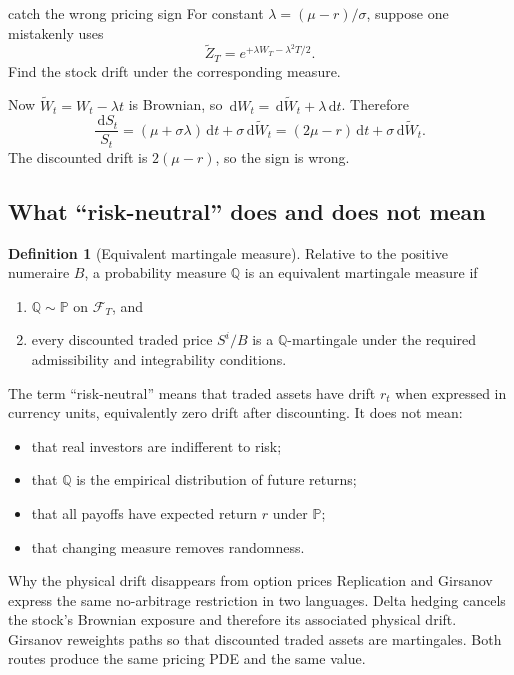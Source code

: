 \documentclass[10pt]{article}
\newcommand{\Pp}{\mathbb P}
\newcommand{\Q}{\mathbb Q}
\newcommand{\1}{\mathbf 1}
\newcommand{\cF}{\mathcal F}
\newcommand{\dd}{\,\mathrm d}
\theoremstyle{definition}
\newtheorem{definition}{Definition}[section]
\begin{document}
\begin{studentexercise}{catch the wrong pricing sign}
For constant \(\lambda=(\mu-r)/\sigma\), suppose one mistakenly uses
\[
\widetilde Z_T=e^{+\lambda W_T-\lambda^2T/2}.
\]
Find the stock drift under the corresponding measure.
\end{studentexercise}
\begin{shortsolution}
Now \(\widetilde W_t=W_t-\lambda t\) is Brownian, so
\(\dd W_t=\dd\widetilde W_t+\lambda\dd t\). Therefore
\[
\frac{\dd S_t}{S_t}
=(\mu+\sigma\lambda)\dd t+\sigma\dd\widetilde W_t
=(2\mu-r)\dd t+\sigma\dd\widetilde W_t.
\]
The discounted drift is \(2(\mu-r)\), so the sign is wrong.
\end{shortsolution}

\subsection{What ``risk-neutral'' does and does not mean}

\begin{definition}[Equivalent martingale measure]
Relative to the positive numeraire \(B\), a probability measure \(\Q\) is an
equivalent martingale measure if
\begin{enumerate}
  \item \(\Q\sim\Pp\) on \(\cF_T\), and
  \item every discounted traded price \(S^i/B\) is a \(\Q\)-martingale
        under the required admissibility and integrability conditions.
\end{enumerate}
\end{definition}

The term ``risk-neutral'' means that traded assets have drift \(r_t\) when
expressed in currency units, equivalently zero drift after discounting. It
does not mean:
\begin{itemize}
  \item that real investors are indifferent to risk;
  \item that \(\Q\) is the empirical distribution of future returns;
  \item that all payoffs have expected return \(r\) under \(\Pp\);
  \item that changing measure removes randomness.
\end{itemize}

\begin{keyidea}{Why the physical drift disappears from option prices}
Replication and Girsanov express the same no-arbitrage restriction in two
languages. Delta hedging cancels the stock's Brownian exposure and therefore
its associated physical drift. Girsanov reweights paths so that discounted
traded assets are martingales. Both routes produce the same pricing PDE and
the same value.
\end{keyidea}
\end{document}
